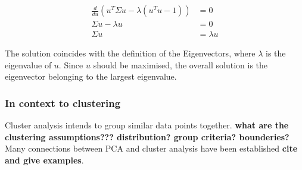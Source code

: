 \documentclass[a4paper, 11pt]{article}
\begin{document}
\begin{align*}
 \frac{d}{du} (u^T \Sigma u - \lambda(u^T u - 1)) & = 0 \\
 \Sigma u - \lambda u & = 0 \\
 \Sigma u & = \lambda u 
\end{align*}

The solution coincides with the definition of the Eigenvectors, where $\lambda$ is the eigenvalue of $u$. Since $u$ should be maximised, the overall solution is the eigenvector belonging to the largest eigenvalue.

\subsubsection{In context to clustering}
Cluster analysis intends to group similar data points together. \textbf{what are the clustering assumptions??? distribution? group criteria? bounderies?}
Many connections between PCA and cluster analysis have been established \textbf{cite and give examples}.
\end{document}
